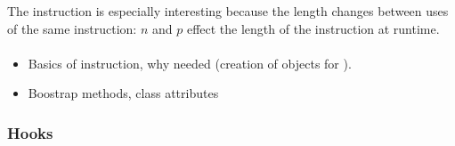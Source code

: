 \documentclass[dissertation.tex]{subfiles}
\begin{document}
{{{{                The  instruction is especially interesting because the length changes between
                uses of the same instruction: \(n\) and \(p\) effect the length of the instruction at runtime.
            
            }
            \paragraph*{}
            {

                \begin{itemize}
                \item
                {
                    Basics of instruction, why needed (creation of  objects for
                    ).
                }
                \item Boostrap methods, class attributes
                \end{itemize}
            }
        }
        \subsubsection{Hooks}
        {

            

        }
    }
}
\end{document}

